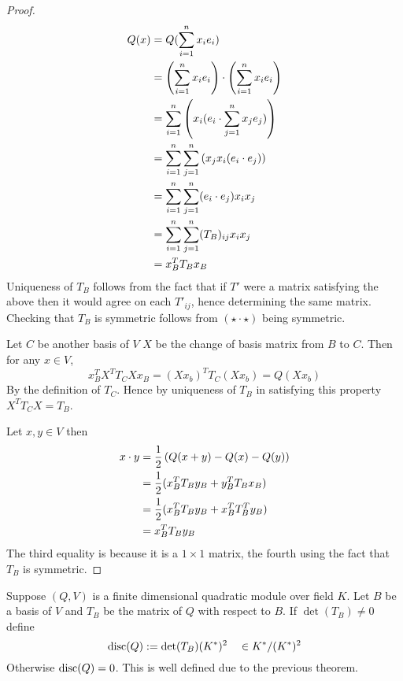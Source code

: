 \begin{proof}
    \begin{align*}
        Q(x) &= Q(\sum_{i = 1}^n x_i e_i) \\
        &= \left(\sum_{i = 1}^n x_i e_i\right) 
        \cdot \left(\sum_{i = 1}^n x_i e_i\right)\\
        &= \sum_{i = 1}^n \left(x_i (e_i 
        \cdot \sum_{j = 1}^n x_j e_j)\right)\\
        &= \sum_{i = 1}^n \sum_{j = 1}^n 
        \left(x_j x_i (e_i \cdot e_j)\right)\\
        &= \sum_{i = 1}^n \sum_{j = 1}^n 
        (e_i \cdot e_j) x_i x_j\\
        &= \sum_{i = 1}^n \sum_{j = 1}^n 
        (T_B)_{ij} x_i x_j\\
        &= x_B^T T_B x_B
    \end{align*}
    Uniqueness of $T_B$ follows from the fact that if
    $T'$ were a matrix satisfying the above then 
    it would agree on each $T'_{ij}$, 
    hence determining the same matrix.
    Checking that $T_B$ is symmetric follows from 
    $(\star\cdot\star)$ being symmetric.

    Let $C$ be another basis of $V$ 
    $X$ be the change of basis matrix 
    from $B$ to $C$.
    Then for any $x \in V$,
    \[x_B^T X^T T_C X x_B = (X x_b)^T T_C (X x_b) = Q(X x_b)\]
    By the definition of $T_C$.
    Hence by uniqueness of $T_B$ in satisfying this property
    $X^T T_C X = T_B$.

    Let $x,y \in V$ then 
    \begin{align*}
        x \cdot y &= \frac{1}{2} \left(Q(x + y) - Q(x) - Q(y)\right) \\
        &=\frac{1}{2} (x_B^T T_B y_B + y_B^T T_B x_B)\\
        &=\frac{1}{2} (x_B^T T_B y_B + x_B^T T_B^T y_B) \\
        &=x_B^T T_B y_B
    \end{align*}
    The third equality is because it is a $1 \times 1$ matrix,
    the fourth using the fact that $T_B$ is symmetric.
\end{proof}

\begin{dfn}[Discriminant]
    Suppose $(Q,V)$ is a finite dimensional
    quadratic module over field $K$. 
    Let $B$ be a basis of $V$ and $T_B$ 
    be the matrix of $Q$ with respect to $B$.
    If $\det(T_B) \ne 0$
    define
    \[\mathrm{disc}(Q):= \det(T_B) (K^*)^2 \quad \in K^* / (K^*)^2\]
    Otherwise $\mathrm{disc}(Q) = 0$.
    This is well defined due to the previous theorem.
\end{dfn}

